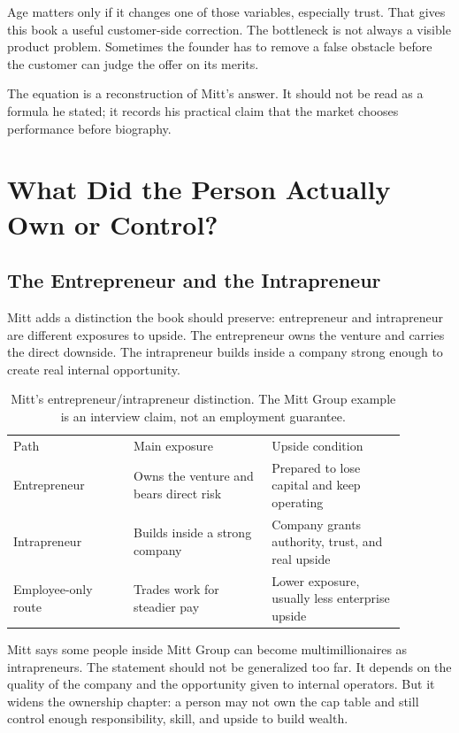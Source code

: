 \documentclass[11pt,oneside]{book}
\begin{document}
Age matters only if it changes one of those variables, especially trust. That gives this book a useful customer-side correction. The bottleneck is not always a visible product problem. Sometimes the founder has to remove a false obstacle before the customer can judge the offer on its merits.

\begin{remark}
The equation is a reconstruction of Mitt's answer. It should not be read as a formula he stated; it records his practical claim that the market chooses performance before biography.
\end{remark}

\chapter{What Did the Person Actually Own or Control?}

\section{The Entrepreneur and the Intrapreneur}

Mitt adds a distinction the book should preserve: entrepreneur and intrapreneur are different exposures to upside. The entrepreneur owns the venture and carries the direct downside. The intrapreneur builds inside a company strong enough to create real internal opportunity.

\begin{table}
\centering
\begin{tabular}{p{0.27\linewidth}p{0.31\linewidth}p{0.30\linewidth}}
Path & Main exposure & Upside condition \\
Entrepreneur & Owns the venture and bears direct risk & Prepared to lose capital and keep operating \\
Intrapreneur & Builds inside a strong company & Company grants authority, trust, and real upside \\
Employee-only route & Trades work for steadier pay & Lower exposure, usually less enterprise upside \\
\end{tabular}
\caption{Mitt's entrepreneur/intrapreneur distinction. The Mitt Group example is an interview claim, not an employment guarantee.}
\end{table}

Mitt says some people inside Mitt Group can become multimillionaires as intrapreneurs. The statement should not be generalized too far. It depends on the quality of the company and the opportunity given to internal operators. But it widens the ownership chapter: a person may not own the cap table and still control enough responsibility, skill, and upside to build wealth.
\end{document}
